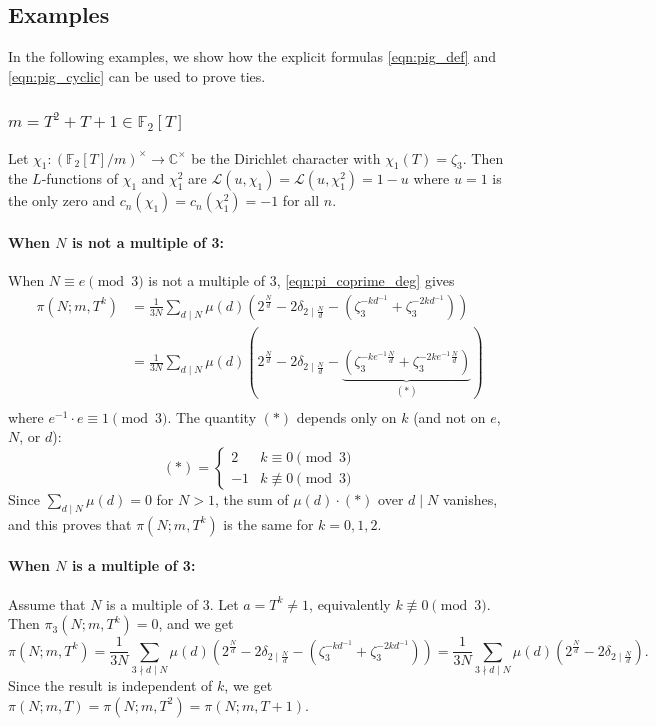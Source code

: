 \documentclass[10pt,reqno]{amsproc}
\newcommand{\bC}{\mathbb{C}}
\newcommand{\bF}{\mathbb{F}}
\newcommand{\cL}{\mathcal{L}}
\newcommand{\1}{\mathds{1}}	%
\theoremstyle{definition}
\theoremstyle{remark}
\begin{document}
\subsection{Examples}

In the following examples, we show how the explicit formulas \eqref{eqn:pig_def} and \eqref{eqn:pig_cyclic} can be used to prove ties.


\subsubsection{\texorpdfstring{\(m = T^2 + T + 1 \in \bF_2[T]\)}{m = T^2 + T + 1 over characteristic 2}}
\label{subsubsec:p2T2T1_explicit}

Let \(\chi_1: (\bF_2[T] / m)^\times \to \bC^\times\) be the Dirichlet character with \(\chi_1(T) = \zeta_3\).
Then the \(L\)-functions of $\chi_1$ and $\chi_1^2$ are $\cL(u, \chi_1) = \cL(u, \chi_1^2) = 1 - u$ where $u = 1$ is the only zero and $c_n(\chi_1) = c_n(\chi_1^2) = -1$ for all $n$.

\paragraph{\textbf{When $N$ is not a multiple of 3:}}
When $N \equiv e \pmod{3}$ is not a multiple of 3, \eqref{eqn:pi_coprime_deg} gives 
\begin{align*}
\pi(N; m, T^k) &= \frac{1}{3N} \sum_{d \mid N} \mu(d) \left(2^{\frac{N}{d}} - 2\delta_{2 \mid \frac{N}{d}} - (\zeta_3^{-kd^{-1}} + \zeta_3^{-2kd^{-1}})\right) \\
&= \frac{1}{3N} \sum_{d \mid N} \mu(d) \left(2^{\frac{N}{d}} - 2\delta_{2 \mid \frac{N}{d}} - \underbrace{(\zeta_3^{-ke^{-1}\frac{N}{d}} + \zeta_3^{-2ke^{-1}\frac{N}{d}})}_{(*)}\right) \\
\end{align*}
where $e^{-1} \cdot e \equiv 1 \pmod{3}$. The quantity $(*)$ depends only on $k$ (and not on $e$, $N$, or $d$):
\[
(*) = \begin{cases}
    2 & k \equiv 0 \pmod{3} \\ -1 & k \not\equiv 0 \pmod{3}
\end{cases}
\]
Since $\sum_{d \mid N} \mu(d) = 0$ for $N > 1$, the sum of $\mu(d) \cdot (*)$ over $d \mid N$ vanishes, and this proves that $\pi(N; m, T^k)$ is the same for $k = 0, 1, 2$.

\paragraph{\textbf{When $N$ is a multiple of 3:}}
Assume that $N$ is a multiple of $3$.
Let $a = T^k \ne 1$, equivalently $k \not \equiv 0 \pmod{3}$.
Then $\pi_3(N; m, T^k) = 0$, and we get
\begin{equation}
\label{eqn:T2T1N3}
\pi(N; m, T^k) = \frac{1}{3N} \sum_{3 \nmid d \mid N} \mu(d) \left(2^{\frac{N}{d}} - 2\delta_{2 \mid \frac{N}{d}} - (\zeta_3^{-kd^{-1}} + \zeta_3^{-2kd^{-1}}) \right) = \frac{1}{3N} \sum_{3 \nmid d \mid N} \mu(d) (2^{\frac{N}{d}} - 2\delta_{2 \mid \frac{N}{d}}).
\end{equation}
Since the result is independent of $k$, we get $\pi(N; m, T) = \pi(N; m, T^2) = \pi(N; m, T + 1)$.
\end{document}
